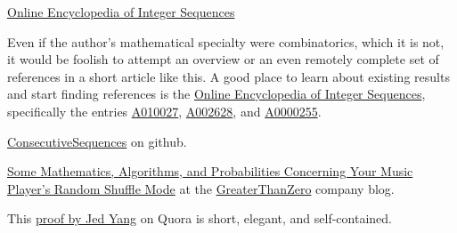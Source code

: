 \documentclass{article}
\begin{document}

\begin{thebibliography}{0}

  \href{http://oeis.org/}{Online Encyclopedia of Integer Sequences}



  Even if the author's mathematical specialty were combinatorics, which it is not,
  it would be foolish to attempt an overview or an even remotely complete set of references
  in a short article like this. A good place to learn about existing results and start finding
  references is the \href{http://oeis.org/}{Online Encyclopedia of Integer Sequences}, specifically
 the entries \href{http://oeis.org/A010027}{A010027}, \href{http://oeis.org/A002628}{A002628}, and
  \href{http://oeis.org/A000255}{A0000255}.

    \href{https://github.com/walkswiththebear/ConsecutiveSequences}{ConsecutiveSequences} on github.

    \href{http://blog.greaterthanzero.com}{Some Mathematics, Algorithms, and Probabilities Concerning Your Music Player’s Random Shuffle Mode} at the \href{https://www.greaterthanzero.com}{GreaterThanZero} company blog. 

 This \href{https://www.quora.com/What-is-the-probability-that-a-shuffled-music-album-will-have-at-least-two-songs-in-their-original-relative-consecutive-order}{proof by Jed Yang}
  on Quora is short, elegant, and self-contained.

\end{thebibliography}
\end{document}

